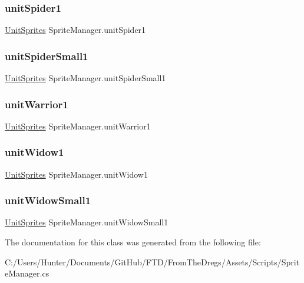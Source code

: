 \subsubsection{\texorpdfstring{unitSpider1}{unitSpider1}}
{\footnotesize\ttfamily \mbox{\hyperlink{class_unit_sprites}{Unit\+Sprites}} Sprite\+Manager.\+unit\+Spider1}

\mbox{\label{class_sprite_manager_abcfa64673eda733ff5a0791fca6774ef}} 
\subsubsection{\texorpdfstring{unitSpiderSmall1}{unitSpiderSmall1}}
{\footnotesize\ttfamily \mbox{\hyperlink{class_unit_sprites}{Unit\+Sprites}} Sprite\+Manager.\+unit\+Spider\+Small1}

\mbox{\label{class_sprite_manager_a468d21273b76232a3c46e4806526191b}} 
\subsubsection{\texorpdfstring{unitWarrior1}{unitWarrior1}}
{\footnotesize\ttfamily \mbox{\hyperlink{class_unit_sprites}{Unit\+Sprites}} Sprite\+Manager.\+unit\+Warrior1}

\mbox{\label{class_sprite_manager_a2de0703584ff32d531f6abeddd2ab249}} 
\subsubsection{\texorpdfstring{unitWidow1}{unitWidow1}}
{\footnotesize\ttfamily \mbox{\hyperlink{class_unit_sprites}{Unit\+Sprites}} Sprite\+Manager.\+unit\+Widow1}

\mbox{\label{class_sprite_manager_af903c428c3cef263662f32fe5e183b6f}} 
\subsubsection{\texorpdfstring{unitWidowSmall1}{unitWidowSmall1}}
{\footnotesize\ttfamily \mbox{\hyperlink{class_unit_sprites}{Unit\+Sprites}} Sprite\+Manager.\+unit\+Widow\+Small1}



The documentation for this class was generated from the following file\+:\begin{DoxyCompactItemize}
\item 
C\+:/\+Users/\+Hunter/\+Documents/\+Git\+Hub/\+F\+T\+D/\+From\+The\+Dregs/\+Assets/\+Scripts/Sprite\+Manager.\+cs\end{DoxyCompactItemize}
